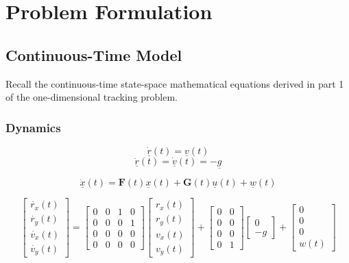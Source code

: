 \documentclass{article}
\begin{document}
\section{Problem Formulation}

\subsection{Continuous-Time Model}
Recall the continuous-time state-space mathematical equations derived in part 1 of the one-dimensional tracking problem.

\subsubsection{Dynamics}

\begin{equation}
    \underline{\dot{r}}(t) = \underline{v}(t)
\end{equation}
\begin{equation}
    \underline{\ddot{r}}(t) = \underline{\dot{v}}(t) = -\underline{g}
\end{equation}

\begin{equation}
    \underline{\dot{x}}(t) = \mathbf{F}(t)\underline{x}(t) + \mathbf{G}(t)\underline{u}(t) + \underline{w}(t)
\end{equation}

\begin{equation*}
    \begin{bmatrix} \dot{r_x}(t) \\ \dot{r_y}(t) \\ \dot{v_x}(t) \\ \dot{v_y}(t) \end{bmatrix} = 
    \begin{bmatrix} 0 & 0 & 1 & 0 \\ 0 & 0 & 0 & 1 \\ 0 & 0 & 0 & 0 \\ 0 & 0 & 0 & 0 \end{bmatrix}
    \begin{bmatrix} r_x(t)\\r_y(t)\\v_x(t)\\v_y(t) \end{bmatrix} +
    \begin{bmatrix} 0 & 0 \\ 0 & 0 \\ 0 & 0 \\ 0 & 1 \end{bmatrix}
    \begin{bmatrix} 0\\-g \end{bmatrix} +
    \begin{bmatrix}
        0 \\ 0 \\ 0 \\ w(t)
    \end{bmatrix}
\end{equation*}
\end{document}
